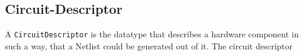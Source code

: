 \documentclass[9pt,final,a4paper,leqno]{article}
\newcommand{\hs}[1]{\mbox{\lstinline[basicstyle=\color{textgray}]!#1!}}
\begin{document}
\subsection{Circuit-Descriptor}
A \hs{CircuitDescriptor} is the datatype that describes a hardware component in such a way, that a Netlist could be generated out of it. The
circuit descriptor 

%
%
%
%
%
%
%
%
%
%
\end{document}
